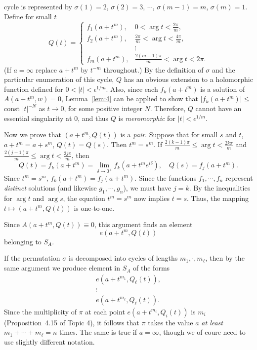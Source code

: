 \documentclass[a4paper,11pt]{article}
\begin{document}
\begin{myproof}
  cycle is represented by $\sigma(1) = 2$, $\sigma(2) = 3$, $\cdots$,
  $\sigma(m-1) = m$, $\sigma(m) = 1$.  Define for small $t$
  $$
  Q(t) =
  \begin{cases}
    f_1(a+t^m), & 0 < \arg t < \frac{2\pi}{m},\\
    f_2(a+t^m), & \frac{2\pi}{m} < \arg t < \frac{4\pi}{m},\\
    & \vdots \\
    f_m(a+t^m), & \frac{2(m-1)\pi}{m} < \arg t < 2\pi.
  \end{cases}
  $$
  (If $a = \infty$ replace $a+t^m$ by $t^{-m}$ throughout.)  By the
  definition of $\sigma$ and the particular enumeration of this
  cycle, $Q$ has an obvious extension to a holomorphic function defined
  for $0 < |t| < \epsilon^{1/m}$.  Also, since each $f_k(a+t^m)$ is a
  solution of $A(a+t^m, w) = 0$, Lemma~\ref{lem:4} can be applied
  to show that $|f_k(a+t^m)| \le $const $|t|^{-N}$ as $t \to 0$, for
  some positive integer $N$.  Therefore, $Q$ cannot have an essential
  singularity at 0, and thus $Q$ is \emph{meromorphic} for $|t| <
  \epsilon^{1/m}$.

  Now we prove that $(a+t^m, Q(t))$ is a \emph{pair}.  Suppose that
  for small $s$ and $t$, $a+t^m = a + s^m$, $Q(t) = Q(s)$.  Then $t^m
  = s^m$.  If $\frac{2(k-1)\pi}{m} \le \arg t < \frac{2k\pi}{m}$ and 
  $\frac{2(j-1)\pi}{m} \le \arg t < \frac{2j\pi}{m}$, then
  $$
  Q(t) = f_k(a+t^m) = \lim_{\delta\to 0^+} f_k(a+t^m
  e^{i\delta}),\quad
  Q(s) = f_j(a+t^m).
  $$
  Since $t^m = s^m$, $f_k(a+t^m) = f_j(a+t^m)$.  Since the functions
  $f_1, \cdots, f_n$ represent \emph{distinct} solutions (and likewise
  $g_1, \cdots, g_n$), we must have $j=k$.  By the inequalities for
  $\arg t$ and $\arg s$, the equation $t^m = s^m$ now implies $t =
  s$.  Thus, the mapping $t \mapsto (a+t^m, Q(t))$ is one-to-one.

  Since $A(a+t^m, Q(t)) \equiv 0$, this argument finds an element
  $$
  e(a+t^m, Q(t))
  $$
  belonging to $S_A$.

  If the permutation $\sigma$ is decomposed into cycles of lengths
  $m_1, \cdot, m_\ell$, then by the same argument we produce element
  in $S_A$ of the forms
  $$
  \begin{array}{c}
    e(a + t^{m_1}, Q_\ell(t)),\\
    \vdots\\
    e(a + t^{m_\ell}, Q_\ell(t)).
  \end{array}
  $$
  Since the multiplicity of $\pi$ at each point $e(a+t^{m_i}, Q_i(t))$
  is $m_i$ (Proposition~4.15 of Topic 4), it follows that $\pi$
  takes the value $a$ \emph{at least} $m_1 + \cdots + m_\ell = n$
  times.  The same is true if $a = \infty$, though we of coure need to
  use slightly different notation.


\end{myproof}
\end{document}
